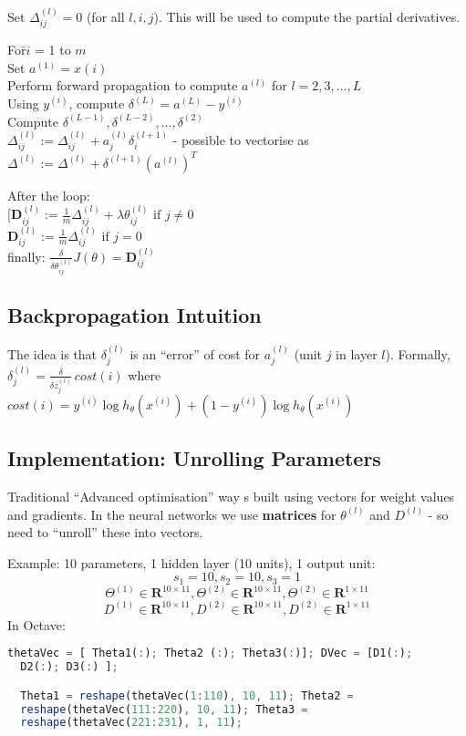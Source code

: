 \documentclass{scrartcl}
\begin{document}
Set $\Delta_{ij}^{(l)} = 0$ (for all $l, i, j$). This will be used to
compute the partial derivatives.
\begin{tabbing}
  For\quad \=$i$ = 1 to $m$  \\
  \>Set $a^{(1)} = x{(i)}$ \\
  \>Perform forward propagation to compute $a^{(l)}$ for $l = 2, 3,
  \dots, L $ \\
  \>Using $y^{(i)}$, compute $\delta^{(L)} = a^{(L)} - y^{(i)}$ \\
  \>Compute $\delta^{(L-1)}, \delta^{(L-2)}, \dots, \delta^{(2)}$ \\
  \>$\Delta_{ij}^{(l)} := \Delta_{ij}^{(l)} + a_j^{(l)}
  \delta_i^{(l+1)}$ - possible to vectorise as $\Delta^{(l)} :=
  \Delta^{(l)} + \delta^{(l+1)}(a^{(l)})^T$ \\
\end{tabbing}   
After the loop:  \\
$[\mathbf{D}_{ij}^{(l)} := \frac{1}{m}\Delta_{ij}^{(l)} + \lambda
\theta_{ij}^{(l)} \textrm{ if }j \ne 0$ \\
$\mathbf{D}_{ij}^{(l)} := \frac{1}{m}\Delta_{ij}^{(l)} \textrm{ if }j
= 0$ \\

finally: $\frac{\delta}{\delta \theta_{ij}^{(l)}} J(\theta) =
\mathbf{D}_{ij}^{(l)}$

\subsection{Backpropagation Intuition}
\label{sec:9-3}

The idea is that $\delta_j^{(l)}$ is an ``error'' of cost for
$a_j^{(l)}$ (unit $j$ in layer $l$). Formally, $\delta_j^{(l)} =
\frac{\delta}{\delta z_j^{(l)}} \, cost(i)$ where $cost(i) = y^{(i)}
\log h_\theta(x^{(i)}) + (1 - y^{(i)}) \log h_\theta(x^{(i)})$

\subsection{Implementation: Unrolling Parameters}
\label{sec:9-4}
Traditional ``Advanced optimisation'' way s built using vectors for
weight values and gradients. In the neural networks we use{\bf
  matrices} for $\theta^{(l)}$ and $D^{(l)}$ - so need to ``unroll''
these into vectors.

Example: 10 parameters, 1 hidden layer (10 units), 1 output unit:
\[ s_1 = 10, s_2 = 10, s_3 = 1\]
\[ \Theta^{(1)} \in \mathbf{R}^{10\times11}, \Theta^{(2)} \in
\mathbf{R}^{10\times11}, \Theta^{(2)} \in \mathbf{R}^{1\times 11} \]
\[ D^{(1)} \in \mathbf{R}^{10\times11}, D^{(2)} \in
\mathbf{R}^{10\times11}, D^{(2)} \in \mathbf{R}^{1\times 11} \] In
Octave:
\begin{lstlisting}[language=Octave, caption=={Plugin function }]
  thetaVec = [ Theta1(:); Theta2 (:); Theta3(:)]; DVec = [D1(:);
  D2(:); D3(:) ];

  Theta1 = reshape(thetaVec(1:110), 10, 11); Theta2 =
  reshape(thetaVec(111:220), 10, 11); Theta3 =
  reshape(thetaVec(221:231), 1, 11);
\end{lstlisting}
\end{document}
